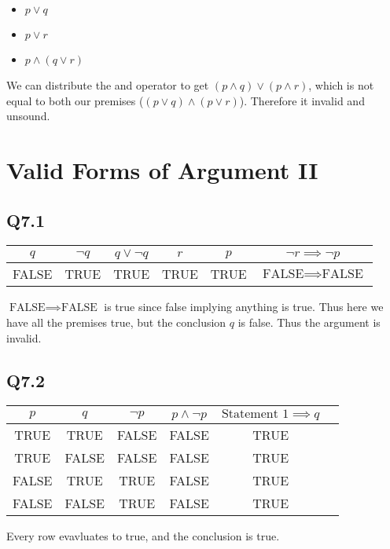 \documentclass[12pt]{article}
\begin{document}
\begin{itemize}
    \item $p \lor q$
    \item $p \lor r$
    \item $p \land (q \lor r)$
\end{itemize}
We can distribute the and operator to get $(p \land q) \lor (p \land r)$, 
which is not equal to both our premises ($(p \lor q) \land (p \lor r)$).
Therefore it invalid and unsound.

\section{Valid Forms of Argument II}
\subsection{Q7.1}

\begin{tabular}{|c|c|c|c|c|c|}
    \hline 
    $q$ & $\neg q$ & $q \lor \neg q$ & $r$ & $p$ & $\neg r \implies \neg p$ \\
    \hline
    FALSE & TRUE & TRUE & TRUE & TRUE & $\text{FALSE} \implies \text{FALSE}$ \\
    \hline
\end{tabular}
\newline
$\text{FALSE} \implies \text{FALSE}$ is true since false implying anything is true. Thus here 
we have all the premises true, but the conclusion $q$ is false. Thus 
the argument is invalid.

\subsection{Q7.2}
\begin{tabular}{|c|c|c|c|c|c|}
    \hline
    $p$ & $q$ & $\neg p$ & $p \land \neg p$ & $\text{Statement 1} \implies q$\\
    \hline
    TRUE & TRUE & FALSE & FALSE & TRUE \\
    \hline
    TRUE & FALSE & FALSE & FALSE & TRUE \\
    \hline
    FALSE & TRUE & TRUE & FALSE & TRUE \\
    \hline
    FALSE & FALSE & TRUE & FALSE & TRUE \\
    \hline
\end{tabular}
\newline
Every row evavluates to true, and the conclusion is true.
\end{document}
